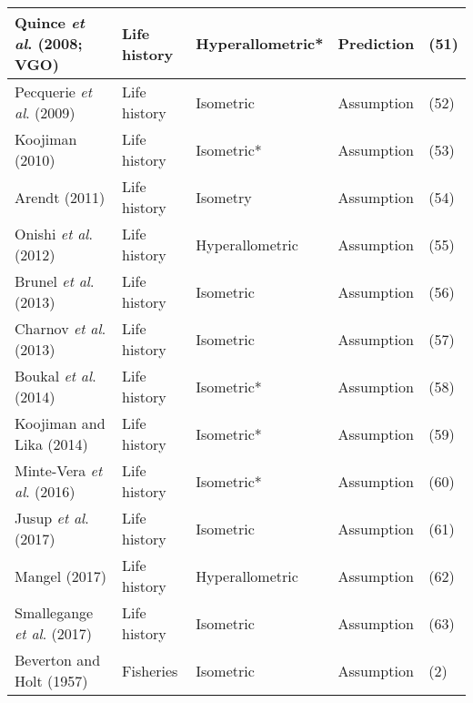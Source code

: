 \documentclass[a4paper]{article} %
\begin{document}
\begin{table}[]
\begin{tabular}{|l|l|l|l|l|}
        Quince \textit{et al}. (2008; VGO)      & Life history        & Hyperallometric* & Prediction                        & (51)          \\ \hline
        Pecquerie \textit{et al}. (2009)        & Life history        & Isometric        & Assumption                        & (52)          \\ \hline
        Koojiman (2010)                         & Life history        & Isometric*       & Assumption                        & (53)          \\ \hline
        Arendt (2011)                           & Life history        & Isometry         & Assumption                        & (54)          \\ \hline
        Onishi \textit{et al}. (2012)           & Life history        & Hyperallometric  & Assumption                        & (55)          \\ \hline
        Brunel \textit{et al}. (2013)           & Life history        & Isometric        & Assumption                        & (56)          \\ \hline
        Charnov \textit{et al}. (2013)          & Life history        & Isometric        & Assumption                        & (57)          \\ \hline
        Boukal \textit{et al}. (2014)           & Life history        & Isometric*       & Assumption                        & (58)          \\ \hline
        Koojiman and Lika (2014)                & Life history        & Isometric*       & Assumption                        & (59)          \\ \hline
        Minte-Vera \textit{et al}. (2016)       & Life history        & Isometric*       & Assumption                        & (60)          \\ \hline
        Jusup \textit{et al}. (2017)            & Life history        & Isometric        & Assumption                        & (61)          \\ \hline
        Mangel (2017)                           & Life history        & Hyperallometric  & Assumption                        & (62)          \\ \hline
        Smallegange \textit{et al}. (2017)      & Life history        & Isometric        & Assumption                        & (63)          \\ \hline
        Beverton and Holt (1957)                & Fisheries           & Isometric        & Assumption                        & (2)           \\ \hline

\end{tabular}
\end{table}
\end{document}
